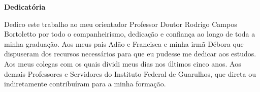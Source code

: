 \begin{center}

\textbf{Dedicatória}
    
\end{center}

Dedico este trabalho ao meu orientador Professor Doutor Rodrigo Campos Bortoletto por todo o companheirismo, dedicação e confiança ao longo de toda a minha graduação. Aos meus pais Adão e Francisca e minha irmã Débora que dispuseram dos recursos necessários para que eu pudesse me dedicar aos estudos. Aos meus colegas com os quais dividi meus dias nos últimos cinco anos. Aos demais Professores e Servidores do Instituto Federal de Guarulhos, que direta ou indiretamente contribuíram para a minha formação.
